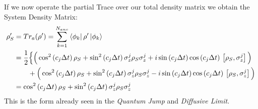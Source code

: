 \documentclass[a4paper,12pt]{article}
\begin{document}
	If we now operate the partial Trace over our total density matrix we obtain the System Density Matrix:
	\begin{align}
		\rho_S' & = Tr_a(\rho') = \sum_{k=1}^{N_{anc}}{\bra{\phi_k}\rho'\ket{\phi_k}} \notag \\
		&= \frac{1}{2} \Big\{ \Big( \cos^{2}{\left( c_j \Delta t \right)} \, \rho_S + \sin^{2}{\left( c_j \Delta t \right)} \, \sigma_{z}^{j}\rho_S\sigma_{z}^{j}
		+i \sin{\left( c_j \Delta t \right)}\cos{\left( c_j \Delta t \right)} \, \left[ \rho_S, \sigma_{z}^{j} \right] \Big) \notag \\
		& \qquad  + \Big( \cos^{2}{\left( c_j \Delta t \right)} \, \rho_S + \sin^{2}{\left( c_j \Delta t \right)} \, \sigma_{z}^{j}\rho_S\sigma_{z}^{j}
		-i \sin{\left( c_j \Delta t \right)}\cos{\left( c_j \Delta t \right)} \, \left[ \rho_S, \sigma_{z}^{j} \right] \Big) \notag \\
		& =	\cos^{2}{\left( c_j \Delta t \right)} \, \rho_S + \sin^{2}{\left( c_j \Delta t \right)} \, \sigma_{z}^{j}\rho_S\sigma_{z}^{j}
		\label{eq:rho_evo_cohe}
	\end{align}
	This is the form already seen in the \textit{Quantum Jump} and \textit{Diffusive Limit}.
\end{document}

